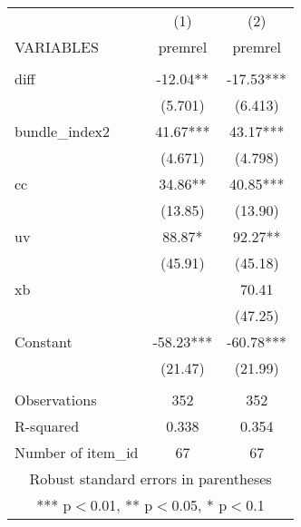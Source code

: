 \begin{tabular}{lcc} \hline
 & (1) & (2) \\
VARIABLES & premrel & premrel \\ \hline
 &  &  \\
diff & -12.04** & -17.53*** \\
 & (5.701) & (6.413) \\
bundle\_index2 & 41.67*** & 43.17*** \\
 & (4.671) & (4.798) \\
cc & 34.86** & 40.85*** \\
 & (13.85) & (13.90) \\
uv & 88.87* & 92.27** \\
 & (45.91) & (45.18) \\
xb &  & 70.41 \\
 &  & (47.25) \\
Constant & -58.23*** & -60.78*** \\
 & (21.47) & (21.99) \\
 &  &  \\
Observations & 352 & 352 \\
R-squared & 0.338 & 0.354 \\
 Number of item\_id & 67 & 67 \\ \hline
\multicolumn{3}{c}{ Robust standard errors in parentheses} \\
\multicolumn{3}{c}{ *** p$<$0.01, ** p$<$0.05, * p$<$0.1} \\
\end{tabular}
